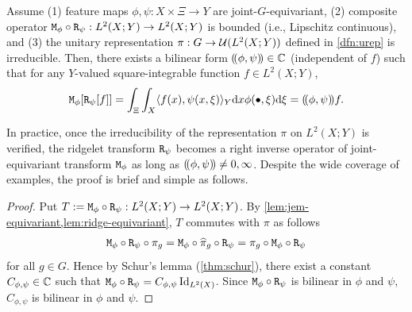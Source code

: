 \begin{theorem} \label{thm:main}
Assume (1) feature maps $\phi,\psi : X \times \Xi \to Y$ are joint-$G$-equivariant, (2) composite operator $\mathtt{M}_\phi \circ \mathtt{R}_\psi : L^2(X;Y) \to L^2(X;Y)$ is bounded (i.e., Lipschitz continuous), and (3) the unitary representation $\pi : G \to \mathcal{U}(L^2(X;Y))$ defined in \cref{dfn:urep} is irreducible.
Then, there exists a bilinear form $(\!(\phi,\psi)\!) \in \mathbb{C}$ (independent of $f$) such that for any $Y$-valued square-integrable function $f \in L^2(X;Y)$,
\begin{align*}
    \lm_\phi [\ridge_\psi [f]]
    = \int_{\Xi} \int_X \iprod{f(x), \psi(x,\xi)}_Y \dd x \phi(\bullet,\xi) \dd \xi 
    = \iiprod{\phi,\psi} f. %
\end{align*}
\end{theorem}
In practice, once the irreducibility of the representation $\pi$ on $L^2(X;Y)$ is verified, the ridgelet transform $\mathtt{R}_\psi$ becomes a right inverse operator of joint-equivariant transform $\mathtt{M}_\phi$ as long as $(\!(\phi,\psi)\!) \neq 0,\infty$. Despite the wide coverage of examples, the proof is brief and simple as follows.
\begin{proof}
Put $T := \mathtt{M}_\phi \circ \mathtt{R}_\psi: L^2(X;Y) \to L^2(X;Y)$. By \cref{lem:jem-equivariant,lem:ridge-equivariant}, $T$ commutes with $\pi$ as follows
\begin{align*}
    \mathtt{M}_\phi \circ \mathtt{R}_\psi \circ \pi_g
    = \mathtt{M}_\phi \circ \widehat{\pi}_g \circ \mathtt{R}_\psi
    = \pi_g \circ \mathtt{M}_\phi \circ \mathtt{R}_\psi
\end{align*}
for all $g \in G$.
Hence by Schur's lemma (\cref{thm:schur}), there exist a constant $C_{\phi,\psi} \in \mathbb{C}$ such that 
    $\mathtt{M}_\phi \circ \mathtt{R}_\psi = C_{\phi,\psi} \operatorname{Id}_{L^2(X)}$.
Since $\mathtt{M}_\phi \circ \mathtt{R}_\psi$ is bilinear in $\phi$ and $\psi$, $C_{\phi,\psi}$ is bilinear in $\phi$ and $\psi$.
\end{proof}

